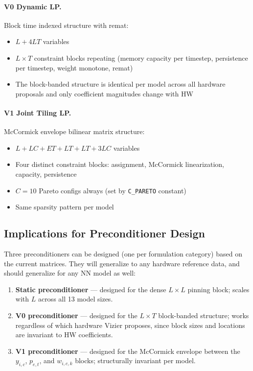 \documentclass{article}
\begin{document}
\paragraph{V0 Dynamic LP.}
Block time indexed structure with remat:
\begin{itemize}
    \item $L + 4LT$ variables
    \item $L \times T$ constraint blocks repeating (memory capacity per
          timestep, persistence per timestep, weight monotone, remat)
    \item The block-banded structure is identical per model across all
          hardware proposals and only coefficient magnitudes change with HW
\end{itemize}

\paragraph{V1 Joint Tiling LP.}
McCormick envelope bilinear matrix structure:
\begin{itemize}
    \item $L + LC + ET + LT + LT + 3LC$ variables
    \item Four distinct constraint blocks:
          assignment, McCormick linearization, capacity, persistence
    \item $C = 10$ Pareto configs always (set by \texttt{C\_PARETO} constant)
    \item Same sparsity pattern per model
\end{itemize}

\subsection{Implications for Preconditioner Design}

Three preconditioners can be designed (one per formulation category)
based on the current matrices.
They will generalize to any hardware reference data, and should generalize for any NN model as well:

\begin{enumerate}
    \item \textbf{Static preconditioner} — designed for the dense
          $L \times L$ pinning block; scales with $L$ across all 13 model
          sizes.

    \item \textbf{V0 preconditioner} — designed for the $L \times T$
          block-banded structure; works regardless of which hardware Vizier
          proposes, since block sizes and locations are invariant to HW
          coefficients.

    \item \textbf{V1 preconditioner} — designed for the McCormick envelope
          between the $y_{i,c}$, $p_{e,t}$, and $w_{i,c,k}$ blocks;
          structurally invariant per model.
\end{enumerate}
\end{document}
